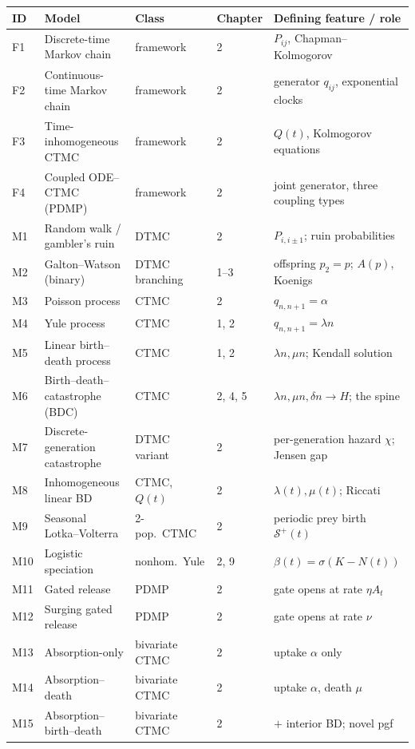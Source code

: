\documentclass[11pt,a4paper]{article}
\begin{document}
{\small
\begin{longtable}{@{}p{0.9cm}p{4.3cm}p{2.6cm}p{2.2cm}p{4.6cm}@{}}
\toprule
\textbf{ID} & \textbf{Model} & \textbf{Class} & \textbf{Chapter} &
\textbf{Defining feature / role} \\
\midrule
\endhead
F1 & Discrete-time Markov chain & framework & 2 & $P_{ij}$, Chapman--Kolmogorov \\
F2 & Continuous-time Markov chain & framework & 2 & generator $q_{ij}$, exponential clocks \\
F3 & Time-inhomogeneous CTMC & framework & 2 & $Q(t)$, Kolmogorov equations \\
F4 & Coupled ODE--CTMC (PDMP) & framework & 2 & joint generator, three coupling types \\
\midrule
M1 & Random walk / gambler's ruin & DTMC & 2 & $P_{i,i\pm1}$; ruin probabilities \\
M2 & Galton--Watson (binary) & DTMC branching & 1--3 & offspring $p_2=p$; $A(p)$, Koenigs \\
M3 & Poisson process & CTMC & 2 & $q_{n,n+1}=\alpha$ \\
M4 & Yule process & CTMC & 1, 2 & $q_{n,n+1}=\lambda n$ \\
M5 & Linear birth--death process & CTMC & 1, 2 & $\lambda n,\mu n$; Kendall solution \\
M6 & Birth--death--catastrophe (BDC) & CTMC & 2, 4, 5 & $\lambda n,\mu n,\delta n\!\to\!H$; the spine \\
M7 & Discrete-generation catastrophe & DTMC variant & 2 & per-generation hazard $\chi$; Jensen gap \\
M8 & Inhomogeneous linear BD & CTMC, $Q(t)$ & 2 & $\lambda(t),\mu(t)$; Riccati \\
M9 & Seasonal Lotka--Volterra & 2-pop.\ CTMC & 2 & periodic prey birth $\mathcal S^+(t)$ \\
M10 & Logistic speciation & nonhom.\ Yule & 2, 9 & $\beta(t)=\sigma(K-N(t))$ \\
M11 & Gated release & PDMP & 2 & gate opens at rate $\eta A_t$ \\
M12 & Surging gated release & PDMP & 2 & gate opens at rate $\nu$ \\
M13 & Absorption-only & bivariate CTMC & 2 & uptake $\alpha$ only \\
M14 & Absorption--death & bivariate CTMC & 2 & uptake $\alpha$, death $\mu$ \\
M15 & Absorption--birth--death & bivariate CTMC & 2 & $+$ interior BD; novel pgf \\

\end{longtable}}
\end{document}
